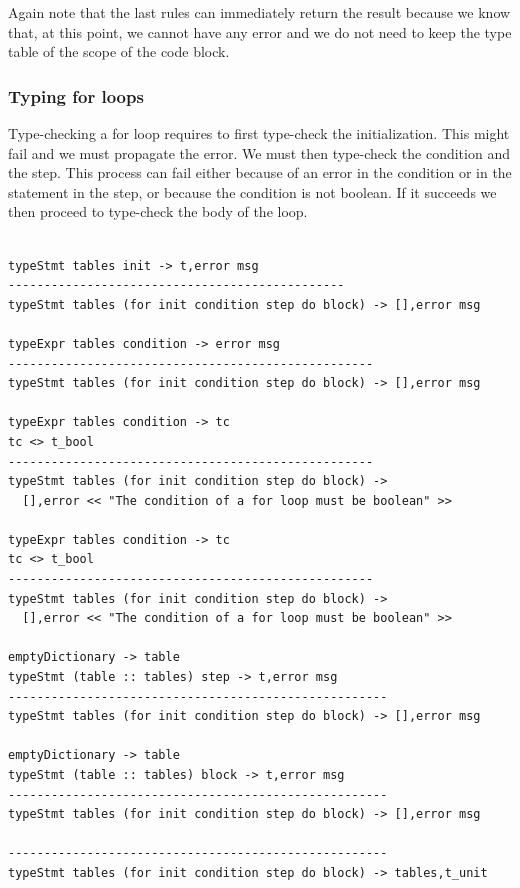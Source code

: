\noindent
Again note that the last rules can immediately return the result because we know that, at this point, we cannot have any error and we do not need to keep the type table of the scope of the code block.

\subsubsection{Typing for loops}
Type-checking a for loop requires to first type-check the initialization. This might fail and we must propagate the error. We must then type-check the condition and the step. This process can fail either because of an error in the condition or in the statement in the step, or because the condition is not boolean.  If it succeeds we then proceed to type-check the body of the loop.
\begin{lstlisting}

typeStmt tables init -> t,error msg
-----------------------------------------------
typeStmt tables (for init condition step do block) -> [],error msg

typeExpr tables condition -> error msg
---------------------------------------------------
typeStmt tables (for init condition step do block) -> [],error msg

typeExpr tables condition -> tc
tc <> t_bool
---------------------------------------------------
typeStmt tables (for init condition step do block) -> 
  [],error << "The condition of a for loop must be boolean" >>
  
typeExpr tables condition -> tc
tc <> t_bool
---------------------------------------------------
typeStmt tables (for init condition step do block) -> 
  [],error << "The condition of a for loop must be boolean" >>

emptyDictionary -> table
typeStmt (table :: tables) step -> t,error msg  
-----------------------------------------------------
typeStmt tables (for init condition step do block) -> [],error msg

emptyDictionary -> table
typeStmt (table :: tables) block -> t,error msg  
-----------------------------------------------------
typeStmt tables (for init condition step do block) -> [],error msg

-----------------------------------------------------
typeStmt tables (for init condition step do block) -> tables,t_unit
\end{lstlisting}

